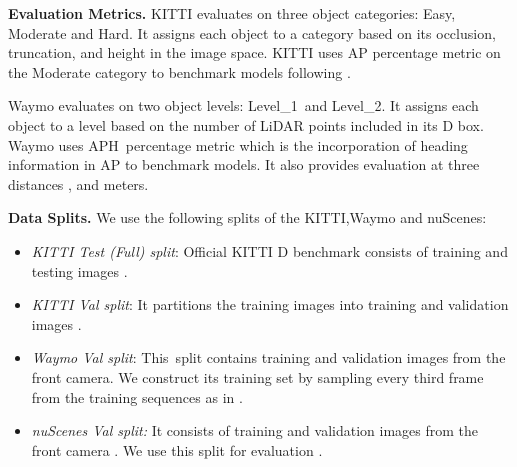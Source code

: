 \documentclass[runningheads]{llncs}
\newcommand{\threeD}{D}
\newcommand{\lidar}{LiDAR}
\newcommand{\kitti}{KITTI}
\newcommand{\nuscenes}{nuScenes}
\newcommand{\waymo}{Waymo}
\newcommand{\valOne}{Val}
\newcommand{\val}{Val}
\newcommand{\ap}{AP}
\newcommand{\apThreeD}{\ap}
\newcommand{\aphThreeD}{APH}
\newcommand{\apThreeDForty}{\ap}
\newcommand{\levelOne}{Level\_1}
\newcommand{\levelTwo}{Level\_2}
\newcommand{\noIndentHeading}[1]{\noindent\textbf{#1}}
\begin{document}
\noIndentHeading{Evaluation Metrics.} 
            \kitti{} evaluates on three object categories: Easy, Moderate and Hard. 
            It assigns each object to a category based on its occlusion, truncation, and height in the image space. 
            \kitti{} uses \apThreeDForty{} percentage metric on the Moderate category to benchmark models \cite{geiger2012we} following \cite{simonelli2019disentangling, simonelli2020disentangling}.


            \waymo{} evaluates on two object levels: \levelOne~and \levelTwo. 
            It assigns each object to a level based on the number of \lidar{} points included in its \threeD{} box. 
\waymo{} uses \aphThreeD~percentage metric which is the incorporation of heading information in \apThreeD{} to benchmark models.
            It also provides evaluation at three distances ,  and  meters.
            
                
\noIndentHeading{Data Splits.}
            We use the following splits of the \kitti,\waymo{} and \nuscenes: \begin{itemize}
                \item \textit{\kitti{} Test (Full) split}: Official \kitti{} \threeD{} benchmark \cite{kitti2012benchmark}
            consists of  training and  testing images \cite{geiger2012we}.
        
                \item \textit{\kitti{} \valOne{} split}: It partitions the  training images into  training and  validation images \cite{chen20153d}.
                
                \item \textit{\waymo{} \val{} split}: This~split \cite{reading2021categorical, wang2021progressive} contains  training and  validation images from the front camera. 
                We construct its training set by sampling every third frame from the training sequences as in \cite{reading2021categorical, wang2021progressive}.

                \item \textit{\nuscenes{} \val{} split:} It consists of  training and  validation images from the front camera \cite{caesar2020nuscenes}. We use this split for evaluation \cite{shi2021geometry}.
            \end{itemize}
\end{document}
